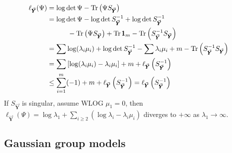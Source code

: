 \begin{align*}
\ell_{\vec{\pmb Y}}(\Psi) & = \log \det \Psi - \operatorname{Tr}\left(\Psi S_{\vec{\pmb Y}}\right)\\
&= \log \det \Psi - \log \det S_{\vec{\pmb Y}}^{-1} + \log \det S_{\vec{\pmb Y}}^{-1} \\
&\qquad \quad- \operatorname{Tr}\left(\Psi S_{\vec{\pmb Y}}\right) + \operatorname{Tr} \pmb 1_m - \operatorname{Tr}\left( S_{\vec{\pmb Y}}^{-1} S_{\vec{\pmb Y}}\right)\\
&= \sum\log (\lambda_i\mu_i) + \log \det S_{\vec{\pmb Y}}^{-1} - \sum \lambda_i\mu_i + m - \operatorname{Tr}\left( S_{\vec{\pmb Y}}^{-1} S_{\vec{\pmb Y}}\right)\\
&= \sum \left[\log (\lambda_i\mu_i) - \lambda_i\mu_i\right] + m + \ell_{\vec{\pmb Y}} \left(S_{\vec{\pmb Y}}^{-1}\right)\\
&\leq \sum_{i=1}^m(-1) + m + \ell_{\vec{\pmb Y}} \left(S_{\vec{\pmb Y}}^{-1}\right) = \ell_{\vec{\pmb Y}} \left(S_{\vec{\pmb Y}}^{-1}\right)
\end{align*}
If $S_{\vec{\pmb Y}}$ is singular, assume WLOG $\mu_1=0$, then $ \ell_{\vec{\pmb Y}} \left(\Psi\right) = \log\lambda_1 + \sum\limits_{i\geq 2} \left(\log \lambda_i - \lambda_i\mu_i\right)$ diverges to $+\infty$ as $\lambda_1\to \infty$.



\subsection{Gaussian group models}

